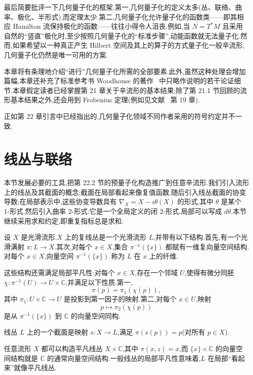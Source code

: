 最后简要批评一下几何量子化的框架.第一,几何量子化的定义太多(丛、联络、曲率、极化、半形式),而定理太少.第二,几何量子化允许量子化的函数类——即其相应 Hamilton 流保持极化的函数——往往小得令人沮丧.例如,当 $N=T^*M$ 且采用自然的“竖直”极化时,至少按照几何量子化的“标准步骤”,动能函数就无法量子化.然而,如果希望以一种真正产生 Hilbert 空间及其上的算子的方式量子化一般辛流形,几何量子化仍然是唯一可用的方案.

本章将有条理地介绍“进行”几何量子化所需的全部要素.此外,虽然这种处理会增加篇幅,本章还补充了标准参考书 Woodhouse 的著作~\cite{Woodhouse1992} 中只略作说明的若干论证细节.本章假定读者已经掌握第 21 章关于辛流形的基本结果;除了第 21.1 节回顾的流形基本结果之外,还会用到 Frobenius 定理(例如见文献~\cite{Lee2006} 第 19 章).

正如第 22 章引言中已经指出的,几何量子化领域不同作者采用的符号约定并不一致.

\section{线丛与联络}
\label{sec:line-bundles-and-connections}

本节发展必要的工具,把第 22.2 节的预量子化构造推广到任意辛流形.我们引入流形上的线丛及其截面的概念;截面在局部看起来像复值函数.随后引入线丛截面的协变导数;在局部表示中,这些协变导数具有 $\nabla_X=X-i\theta(X)$ 的形式,其中 $\theta$ 是某个 1-形式.然后引入曲率 2-形式:它是一个全局定义的闭 2-形式,局部可以写成 $d\theta$.本节继续采用求和约定,即重复指标总是求和.

\begin{definition}[复线丛]
\label{def:complex-line-bundle}
设 $X$ 是光滑流形.$X$ 上的复线丛是一个光滑流形 $L$,并带有以下结构.首先,有一个光滑满射 $\pi:L\to X$.其次,对每个 $x\in X$,集合 $\pi^{-1}(\{x\})$ 都赋有一维复向量空间结构.对每个 $x\in X$,向量空间 $\pi^{-1}(\{x\})$ 称为 $L$ 在 $x$ 上的纤维.

这些结构还需满足局部平凡性:对每个 $x\in X$,存在一个邻域 $U$,使得有微分同胚
$\chi:\pi^{-1}(U)\to U\times\mathbb C$,并满足以下性质.第一,
\[
 \pi(p)=\pi_1(\chi(p)),
\]
其中 $\pi_1:U\times\mathbb C\to U$ 是投影到第一因子的映射.第二,对每个 $x\in U$,映射
\[
 p\longmapsto \pi_2(\chi(p))
\]
是从 $\pi^{-1}(\{x\})$ 到 $\mathbb C$ 的向量空间同构.

线丛 $L$ 上的一个截面是映射 $s:X\to L$,满足 $\pi(s(p))=p$(对所有 $p\in X$).
\end{definition}

任意流形 $X$ 都可以构造平凡线丛 $X\times\mathbb C$,其中 $\pi(x,z)=x$,而 $\{x\}\times\mathbb C$ 的向量空间结构就是 $\mathbb C$ 的通常向量空间结构.一般线丛的局部平凡性意味着,$L$ 在局部“看起来”就像平凡线丛.

